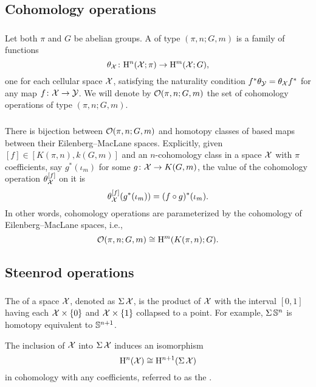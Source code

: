 \subsection{Cohomology operations}

\subsubsection{}
Let both $\pi$ and $G$ be abelian groups.
A  of type $(\pi, n; G, m)$ is a family of functions
\[
\theta_{\mathcal{X}} \colon \mathrm{H}^n(\mathcal{X}; \pi) \to \mathrm{H}^m(\mathcal{X}; G),
\]
one for each cellular space $\mathcal{X}$, satisfying the naturality condition $f^* \theta_{\mathcal{Y}} = \theta_{\mathcal{X}} f^*$ for any map $f \colon \mathcal{X} \to \mathcal{Y}$.
We will denote by $\mathcal{O}(\pi, n; G,m)$ the set of cohomology operations of type $(\pi, n; G,m)$.

\subsubsection{}
There is bijection between $\mathcal{O}(\pi, n; G,m)$ and homotopy classes of based maps between their Eilenberg--MacLane spaces.
Explicitly, given $[f] \in [K(\pi,n), k(G,m)]$ and an $n$-cohomology class in a space $\mathcal{X}$ with $\pi$ coefficients, say $g^*(\iota_m)$ for some $g \colon \mathcal{X} \to K(G, m)$, the value of the cohomology operation $\theta_{\mathcal{X}}^{[f]}$ on it is
\[
\theta_{\mathcal{X}}^{[f]}(g^*(\iota_m)) = (f \circ g)^*(\iota_m).
\]
In other words, cohomology operations are parameterized by the cohomology of Eilenberg--MacLane spaces, i.e.,
\[
\mathcal{O}(\pi, n; G,m) \cong \mathrm{H}^m(K(\pi,n); G).
\]

\subsection{Steenrod operations}\label{ss:steenrod}

\subsubsection{}

The  of a space $\mathcal{X}$, denoted as $\operatorname{\Sigma} \mathcal{X}$, is the product of $\mathcal{X}$ with the interval $[0,1]$ having each $\mathcal{X} \times \{0\}$ and $\mathcal{X} \times \{1\}$ collapsed to a point.
For example, $\operatorname{\Sigma} \mathbb{S}^n$ is homotopy equivalent to $\mathbb{S}^{n+1}$.

The inclusion of $\mathcal{X}$ into $\operatorname{\Sigma} \mathcal{X}$ induces an isomorphism
\[
\mathrm{H}^n(\mathcal{X}) \cong \mathrm{H}^{n+1}(\operatorname{\Sigma} \mathcal{X})
\]
in cohomology with any coefficients, referred to as the .

